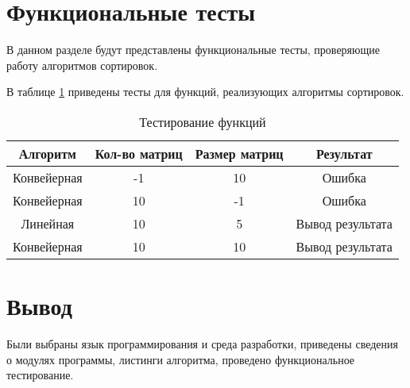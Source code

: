 \clearpage

\section{Функциональные тесты}

В данном разделе будут представлены функциональные тесты, проверяющие работу алгоритмов сортировок.

В таблице \ref{tbl:func_test} приведены тесты для функций, реализующих алгоритмы сортировок.

\begin{table}[h!]
	\begin{center}
		\caption{\label{tbl:func_test}Тестирование функций}
		\begin{tabular}{|c|c|c|c|}
			\hline
			\textbf{Алгоритм} & \textbf{Кол-во матриц} & \textbf{Размер матриц} & \textbf{Результат} \\ 
			\hline
			Конвейерная & -1  & 10 & Ошибка \\\hline
			Конвейерная & 10  & -1 & Ошибка \\\hline
			Линейная & 10  & 5 & Вывод результата \\\hline
			Конвейерная & 10  & 10 & Вывод результата \\\hline
		\end{tabular}
	\end{center}
\end{table}

\section*{Вывод}
Были выбраны язык программирования и среда разработки, приведены сведения о модулях программы, листинги алгоритма, проведено функциональное тестирование.